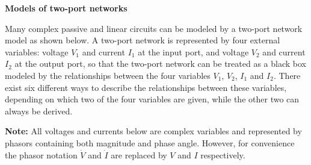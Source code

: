 {\bf Models of two-port networks}

Many complex passive and linear circuits can be modeled by a two-port network
model as shown below. A two-port network is represented by four external 
variables: voltage $V_1$ and current $I_1$ at the input port, and voltage 
$V_2$ and current $I_2$ at the output port, so that the two-port network 
can be treated as a black box modeled by the relationships between the 
four variables $V_1$, $V_2$, $I_1$ and $I_2$. There exist six different ways 
to describe the relationships between these variables, depending on which 
two of the four variables are given, while the other two can always be derived.

{\bf Note: } All voltages and currents below are complex variables and
represented by phasors containing both magnitude and phase angle. However, 
for convenience the phasor notation $\dot{V}$ and $\dot{I}$ are replaced by 
$V$ and $I$ respectively.


